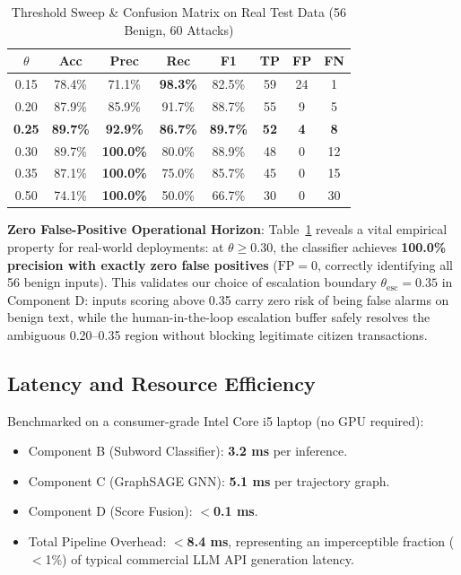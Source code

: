 \documentclass[conference]{IEEEtran}
\begin{document}
\begin{table}[h]
\centering
\caption{Threshold Sweep \& Confusion Matrix on Real Test Data (56 Benign, 60 Attacks)}
\label{tab:threshold_sweep}
\begin{tabularx}{\columnwidth}{cccccccc}
\toprule
$\theta$ & \textbf{Acc} & \textbf{Prec} & \textbf{Rec} & \textbf{F1} & \textbf{TP} & \textbf{FP} & \textbf{FN} \\
\midrule
0.15 & 78.4\% & 71.1\% & \textbf{98.3\%} & 82.5\% & 59 & 24 & 1 \\
0.20 & 87.9\% & 85.9\% & 91.7\% & 88.7\% & 55 & 9 & 5 \\
\textbf{0.25} & \textbf{89.7\%} & \textbf{92.9\%} & \textbf{86.7\%} & \textbf{89.7\%} & \textbf{52} & \textbf{4} & \textbf{8} \\
0.30 & 89.7\% & \textbf{100.0\%} & 80.0\% & 88.9\% & 48 & 0 & 12 \\
0.35 & 87.1\% & \textbf{100.0\%} & 75.0\% & 85.7\% & 45 & 0 & 15 \\
0.50 & 74.1\% & \textbf{100.0\%} & 50.0\% & 66.7\% & 30 & 0 & 30 \\
\bottomrule
\end{tabularx}
\end{table}

\noindent\textbf{Zero False-Positive Operational Horizon}: Table~\ref{tab:threshold_sweep} reveals a vital empirical property for real-world deployments: at $\theta \ge 0.30$, the classifier achieves \textbf{100.0\% precision with exactly zero false positives} ($\text{FP} = 0$, correctly identifying all 56 benign inputs). This validates our choice of escalation boundary $\theta_{\text{esc}} = 0.35$ in Component D: inputs scoring above 0.35 carry zero risk of being false alarms on benign text, while the human-in-the-loop escalation buffer safely resolves the ambiguous 0.20--0.35 region without blocking legitimate citizen transactions.

\subsection{Latency and Resource Efficiency}
Benchmarked on a consumer-grade Intel Core i5 laptop (no GPU required):
\begin{itemize}
    \item Component B (Subword Classifier): \textbf{3.2 ms} per inference.
    \item Component C (GraphSAGE GNN): \textbf{5.1 ms} per trajectory graph.
    \item Component D (Score Fusion): \textbf{$<$0.1 ms}.
    \item Total Pipeline Overhead: \textbf{$<$8.4 ms}, representing an imperceptible fraction ($<$1\%) of typical commercial LLM API generation latency.
\end{itemize}
\end{document}
